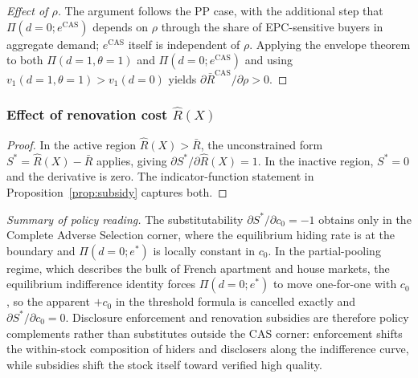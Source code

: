 \documentclass[10pt,letterpaper]{bp-template-concise}
\begin{document}
\begin{proof}[Effect of $\rho$]
The argument follows the PP case, with the additional step that $\Pi(d=0;e^{\text{CAS}})$ depends on $\rho$ through the share of EPC-sensitive buyers in aggregate demand; $e^{\text{CAS}}$ itself is independent of $\rho$. Applying the envelope theorem to both $\Pi(d=1,\theta=1)$ and $\Pi(d=0;e^{\text{CAS}})$ and using $v_1(d=1,\theta=1) > v_1(d=0)$ yields $\partial \bar R^{\text{CAS}}/\partial \rho > 0$.
\end{proof}

\subsubsection*{Effect of renovation cost $\hat R(X)$}

\begin{proof}
In the active region $\hat R(X) > \bar R$, the unconstrained form $S^* = \hat R(X) - \bar R$ applies, giving $\partial S^*/\partial \hat R(X) = 1$. In the inactive region, $S^* = 0$ and the derivative is zero. The indicator-function statement in Proposition~\ref{prop:subsidy} captures both.
\end{proof}

\medskip

\noindent\textit{Summary of policy reading.} The substitutability $\partial S^*/\partial c_0 = -1$ obtains only in the Complete Adverse Selection corner, where the equilibrium hiding rate is at the boundary and $\Pi(d=0;e^*)$ is locally constant in $c_0$. In the partial-pooling regime, which describes the bulk of French apartment and house markets, the equilibrium indifference identity forces $\Pi(d=0;e^*)$ to move one-for-one with $c_0$, so the apparent $+c_0$ in the threshold formula is cancelled exactly and $\partial S^*/\partial c_0 = 0$. Disclosure enforcement and renovation subsidies are therefore policy complements rather than substitutes outside the CAS corner: enforcement shifts the within-stock composition of hiders and disclosers along the indifference curve, while subsidies shift the stock itself toward verified high quality.

\clearpage


\end{document}
